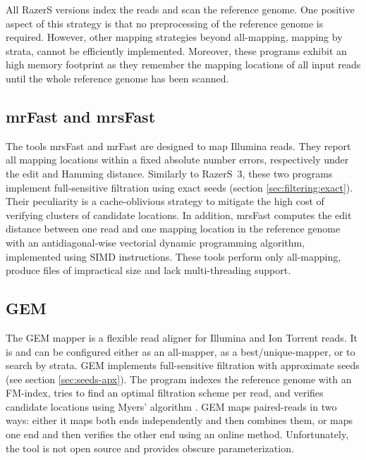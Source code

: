 All RazerS versions index the reads and scan the reference genome.
One positive aspect of this strategy is that no preprocessing of the reference genome is required.
However, other mapping strategies beyond all-mapping, \eg mapping by strata, cannot be efficiently implemented.
Moreover, these programs exhibit an high memory footprint as they remember the mapping locations of all input reads until the whole reference genome has been scanned.


\subsection{mrFast and mrsFast}
\label{background:mappers:mrsfast}

The tools mrsFast \citep{Hach2010} and mrFast \citep{Ahmadi2012} are designed to map Illumina reads.
They report all mapping locations within a fixed absolute number errors, respectively under the edit and Hamming distance.
Similarly to RazerS~3, these two programs implement full-sensitive filtration using exact seeds (section \ref{sec:filtering:exact}).
Their peculiarity is a cache-oblivious strategy to mitigate the high cost of verifying clusters of candidate locations.
In addition, mrsFast computes the edit distance between one read and one mapping location in the reference genome with an antidiagonal-wise vectorial dynamic programming algorithm, implemented using SIMD instructions.
These tools perform only all-mapping, produce files of impractical size and lack multi-threading support.


\subsection{GEM}
\label{background:mappers:gem}

The GEM mapper \citep{MarcoSola2012} is a flexible read aligner for Illumina and Ion Torrent reads.
It is  and can be configured either as an all-mapper, as a best/unique-mapper, or to search by strata.
GEM implements full-sensitive filtration with approximate seeds (see section \ref{sec:seeds-apx}).
The program indexes the reference genome with an FM-index, tries to find an optimal filtration scheme per read, and verifies candidate locations using Myers' algorithm \cite{Myers1999}.
GEM maps paired-reads in two ways: either it maps both ends independently and then combines them, or maps one end and then verifies the other end using an online method.
Unfortunately, the tool is not open source and provides obscure parameterization.

